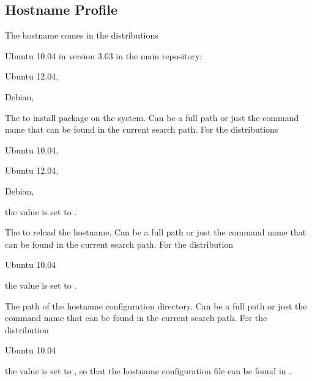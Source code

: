 \subsection{Hostname Profile}

The hostname comes in the distributions 
\begin{compactitem}
\item[\TheDistribution{ubuntu}] Ubuntu 10.04 in version 3.03 in the main repository;
\item[\TheDistribution{ubuntu}] Ubuntu 12.04,
\item[\TheDistribution{debian}] Debian,
\end{compactitem}


The  to install package on the system. Can be a full path or
just the command name that can be found in the current search path. 
For the distributions 
\begin{inparaitem}
\item[\TheDistribution{ubuntu}] Ubuntu 10.04,
\item[\TheDistribution{ubuntu}] Ubuntu 12.04,
\item[\TheDistribution{debian}] Debian,
\end{inparaitem}
the value is set to .


The  to reload the hostname. Can be a full path or
just the command name that can be found in the current search path.
For the distribution
\begin{inparaitem}
\item[\TheDistribution{ubuntu}] Ubuntu 10.04
\end{inparaitem}
the value is set to .


The path of the hostname configuration directory. Can be a full path or
just the command name that can be found in the current search path.
For the distribution
\begin{inparaitem}
\item[\TheDistribution{ubuntu}] Ubuntu 10.04
\end{inparaitem}
the value is set to , so that the hostname configuration
file can be found in .

